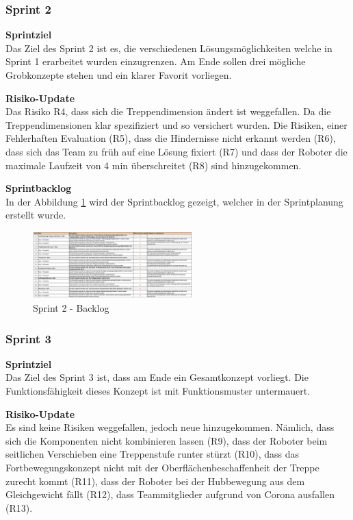 \subsubsection{Sprint 2}
\textbf{Sprintziel}\\
Das Ziel des Sprint 2 ist es, die verschiedenen Lösungsmöglichkeiten welche in Sprint 1 erarbeitet wurden einzugrenzen. Am Ende sollen drei mögliche Grobkonzepte stehen und ein klarer Favorit vorliegen.

\textbf{Risiko-Update}\\
Das Risiko R4, dass sich die Treppendimension ändert ist weggefallen. Da die Treppendimensionen klar spezifiziert und so versichert wurden. Die Risiken, einer Fehlerhaften Evaluation (R5), dass die Hindernisse nicht erkannt werden (R6), dass sich das Team zu früh auf eine Lösung fixiert (R7) und dass der Roboter die maximale Laufzeit von 4 min überschreitet (R8) sind hinzugekommen.

\textbf{Sprintbacklog}\\
In der Abbildung \ref{fig:sprint-backlog-2} wird der Sprintbacklog gezeigt, welcher in der Sprintplanung erstellt wurde.
\begin{figure}[H]
  \includegraphics[angle=270,width=0.55\textwidth]{img/projektmanagement/sprint2-backlog2.png}
  \centering
  \caption{Sprint 2 - Backlog}
  \label{fig:sprint-backlog-2}
\end{figure}

\subsubsection{Sprint 3}
\textbf{Sprintziel}\\
Das Ziel des Sprint 3 ist, dass am Ende ein Gesamtkonzept vorliegt. Die Funktionsfähigkeit dieses Konzept ist mit Funktionsmuster untermauert.

\textbf{Risiko-Update}\\
Es sind keine Risiken weggefallen, jedoch neue hinzugekommen. Nämlich, dass sich die Komponenten nicht kombinieren lassen (R9), dass der Roboter beim seitlichen Verschieben eine Treppenstufe runter stürzt (R10), dass das Fortbewegungskonzept nicht mit der Oberflächenbeschaffenheit der Treppe zurecht kommt (R11), dass der Roboter bei der Hubbewegung aus dem Gleichgewicht fällt (R12), dass Teammitglieder aufgrund von Corona ausfallen (R13).

